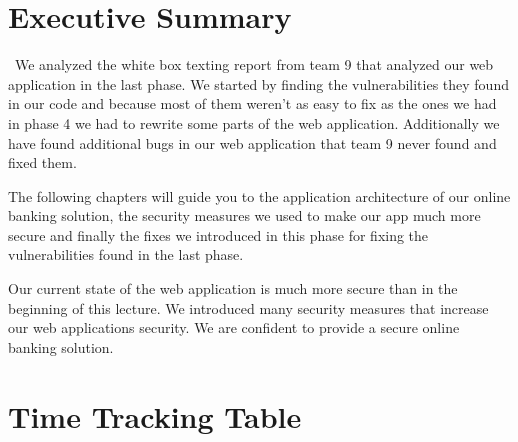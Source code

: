 \documentclass[headsepline,footsepline,footinclude=false,oneside,fontsize=11pt,paper=a4,listof=totoc,bibliography=totoc]{scrbook} %
\begin{document}


\frontmatter{}


{
	\chapter{Executive Summary}\
	We analyzed the white box texting report from team 9 that analyzed our web application in the last phase. We started by finding the vulnerabilities they found in our code and because most of them weren't as easy to fix as the ones we had in phase 4 we had to rewrite some parts of the web application. Additionally we have found additional bugs in our web application that team 9 never found and fixed them.
	
	The following chapters will guide you to the application architecture of our online banking solution, the security measures we used to make our app much more secure and finally the fixes we introduced in this phase for fixing the vulnerabilities found in the last phase.
	
	Our current state of the web application is much more secure than in the beginning of this lecture. We introduced many security measures that increase our web applications security. We are confident to provide a secure online banking solution.
}

\pagebreak
%
%
%
%
\tableofcontents{}
\mainmatter{}

\chapter{Time Tracking Table}

\begin{table}[htb]

	\centering
\end{table}
\end{document}
